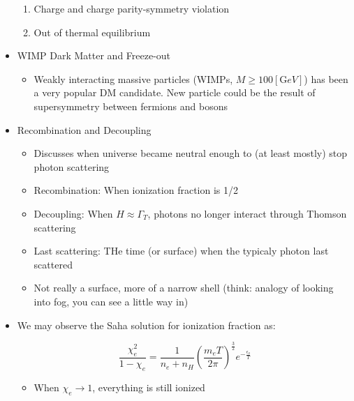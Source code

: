 \begin{itemize}
\begin{enumerate}
      \item Charge and charge parity-symmetry violation

      \item Out of thermal equilibrium

    \end{enumerate}

  \item WIMP Dark Matter and Freeze-out

    \begin{itemize}

      \item Weakly interacting massive particles (WIMPs, $M\geq 100[\si{\giga eV}]$) has been a very popular DM candidate. New particle could be the result of supersymmetry between fermions and bosons

    \end{itemize}

  \item Recombination and Decoupling

    \begin{itemize}

      \item Discusses when universe became neutral enough to (at least mostly) stop photon scattering

      \item Recombination: When ionization fraction is 1/2

      \item Decoupling: When $H\approx\Gamma_T$, photons no longer interact through Thomson scattering

      \item Last scattering: THe time (or surface) when the typicaly photon last scattered

      \item Not really a surface, more of a narrow shell (think: analogy of looking into fog, you can see a little way in)

    \end{itemize}

  \item We may observe the Saha solution for ionization fraction as:

    $$\frac{\chi_e^2}{1-\chi_e}=\frac{1}{n_e+n_H}\left( \frac{m_eT}{2\pi} \right)^{\frac{3}{2}}e^{-\frac{\epsilon_o}{T}}$$

    \begin{itemize}

      \item When $\chi_e\to 1$, everything is still ionized


\end{itemize}
\end{itemize}
